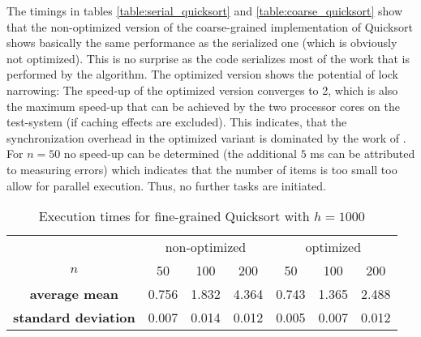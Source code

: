 The timings in tables \ref{table:serial_quicksort} and \ref{table:coarse_quicksort} show that the non-optimized version of the coarse-grained implementation of Quicksort shows basically the same performance as the serialized one (which is obviously not optimized). This is no surprise as the code serializes most of the work that is performed by the algorithm. The optimized version shows the potential of lock narrowing: The speed-up of the optimized version converges to 2, which is also the maximum speed-up that can be achieved by the two processor cores on the test-system (if caching effects are excluded). This indicates, that the synchronization overhead in the optimized variant is dominated by the work of . For $n = 50$ no speed-up can be determined (the additional $5$ ms can be attributed to measuring errors) which indicates that the number of items is too small too allow for parallel execution. Thus, no further tasks are initiated. 

\begin{table}[h!]
\begin{center}
\begin{tabular}{c |c|c|c||c|c|c|}
  \multicolumn{1}{c}{} & \multicolumn{3}{c}{non-optimized} & \multicolumn{3}{c}{optimized}\\ \cline{2-7}
  $n$ & 50 & 100 & 200 & 50 & 100 & 200\\ \cline{2-7}
  \textbf{average mean} & 0.756 & 1.832 & 4.364 & 0.743 & 1.365 & 2.488	\\ \cline{2-7}
  \textbf{standard deviation} & 0.007 & 0.014 & 0.012 & 0.005 & 0.007 & 0.012\\ \cline{2-7}
\end{tabular}
\caption{Execution times for fine-grained Quicksort with $h = 1000$}
\label{table:fine_quicksort}
\end{center}
\end{table}

